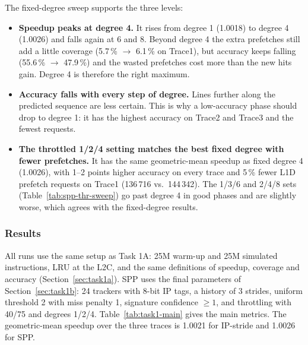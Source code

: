 \documentclass[11pt,a4paper]{article}
\begin{document}
The fixed-degree sweep supports the three levels:
\begin{itemize}
    \item \textbf{Speedup peaks at degree 4.} It rises from degree 1 (1.0018) to degree 4 (1.0026)
          and falls again at 6 and 8. Beyond degree 4 the extra prefetches still add a little coverage
          (5.7\,\% $\to$ 6.1\,\% on Trace1), but accuracy keeps falling (55.6\,\% $\to$ 47.9\,\%) and
          the wasted prefetches cost more than the new hits gain. Degree 4 is therefore the right
          maximum.
    \item \textbf{Accuracy falls with every step of degree.} Lines further along the predicted
          sequence are less certain. This is why a low-accuracy phase should drop to degree 1:
          it has the highest accuracy on Trace2 and Trace3 and the fewest requests.
    \item \textbf{The throttled 1/2/4 setting matches the best fixed degree with fewer
          prefetches.} It has the same geometric-mean speedup as fixed degree 4 (1.0026), with 1--2
          points higher accuracy on every trace and 5\,\% fewer L1D prefetch requests on Trace1
          (136\,716 vs.\ 144\,342). The 1/3/6 and 2/4/8 sets (Table~\ref{tab:spp-thr-sweep})
          go past degree 4 in good phases and are slightly worse, which agrees with the fixed-degree
          results.
\end{itemize}

\subsubsection{Results}
\label{sec:task1b-results}
All runs use the same setup as Task 1A: 25M warm-up and 25M simulated instructions, LRU at the
L2C, and the same definitions of speedup, coverage and accuracy (Section~\ref{sec:task1a}). SPP
uses the final parameters of Section~\ref{sec:task1b}: 24 trackers with 8-bit IP tags, a history of
3 strides, uniform threshold 2 with miss penalty 1, signature confidence $\ge 1$, and throttling
with 40/75 and degrees 1/2/4. Table~\ref{tab:task1-main} gives the main metrics. The
geometric-mean speedup over the three traces is 1.0021 for IP-stride and 1.0026 for SPP.
\end{document}
